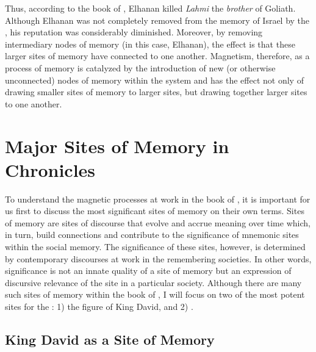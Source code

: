 \noindent
Thus, according to the book of \chronicles, Elhanan killed \emph{Lahmi} the \emph{brother} of Goliath. Although Elhanan was not completely removed from the memory of Israel by the \chronicler, his reputation was considerably diminished. Moreover, by removing intermediary nodes of memory (in this case, Elhanan), the effect is that these larger sites of memory have connected to one another. Magnetism, therefore, as a process of memory is catalyzed by the introduction of new (or otherwise unconnected) nodes of memory within the system and has the effect not only of drawing smaller sites of memory to larger sites, but drawing together larger sites to one another.


\section{Major Sites of Memory in Chronicles}

To understand the magnetic processes at work in the book of \chronicles, it is important for us first to discuss the most significant sites of memory on their own terms. Sites of memory are sites of discourse that evolve and accrue meaning over time which, in turn, build connections and contribute to the significance of mnemonic sites within the social memory. The significance of these sites, however, is determined by contemporary discourses at work in the remembering societies. In other words, significance is not an innate quality of a site of memory but an expression of discursive relevance of the site in a particular society. Although there are many such sites of memory within the book of \chronicles, I will focus on two of the most potent sites for the \chronicler: 1) the figure of King David, and 2) \solomonstemple.

\subsection{King David as a Site of Memory}

